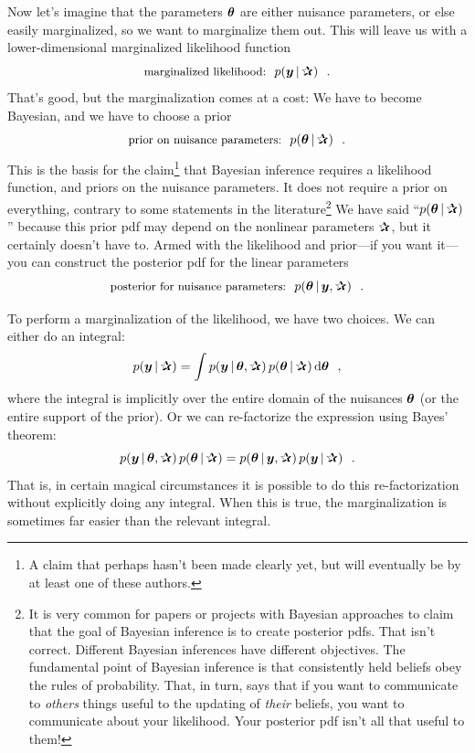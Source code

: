 Now let's imagine that the parameters $\boldsymbol{\theta}$ are either nuisance
parameters, or else easily marginalized, so we want to marginalize
them out.
This will leave us with a lower-dimensional marginalized likelihood
function
\begin{equation}
\mbox{\small marginalized likelihood:} \hquad p(\vy\given\bP) \hquad.
\end{equation}
That's good, but the marginalization comes at a cost:
We have to become Bayesian, and we have to choose a prior
\begin{equation}
\mbox{\small prior on nuisance parameters:} \hquad p(\vtheta\given\bP) \hquad.
\end{equation}
This is the basis for the claim\footnote{A claim that perhaps hasn't been made clearly
  yet, but will eventually be by at least one of these authors.} that Bayesian
inference requires a likelihood function, and priors on the nuisance parameters.
It does not require a prior on everything, contrary to some statements
in the literature\footnote{It is very common for papers or projects with
  Bayesian approaches to claim that the
  goal of Bayesian inference is to create posterior pdfs. That isn't correct.
  Different Bayesian inferences have different objectives. The fundamental
  point
  of Bayesian inference is that consistently held beliefs obey the rules of
  probability. That, in turn, says that if you want
  to communicate to \emph{others} things useful to the
  updating of \emph{their} beliefs, you want to communicate about your likelihood.
  Your posterior pdf isn't all that useful to them!\label{note:lf}}
We have said ``$p(\vtheta\given\bP)$'' because this prior pdf may depend on
the nonlinear parameters $\bP$, but it certainly doesn't have to.
Armed with the likelihood and prior---if you want it---you can construct
the posterior pdf for the linear parameters
\begin{equation}
\mbox{\small posterior for nuisance parameters:} \hquad p(\vtheta\given\vy,\bP) \hquad.
\end{equation}

To perform a marginalization of the likelihood, we have two choices.
We can either do an integral:
\begin{equation}\label{eq:integral}
p(\vy\given\bP) = \int p(\vy\given\vtheta,\bP)\,p(\vtheta\given\bP)\,\dd\vtheta
\hquad,
\end{equation}
where the integral is implicitly over the entire domain of the
nuisances $\boldsymbol{\theta}$ (or the entire support of the prior).
Or we can re-factorize the expression using Bayes' theorem:
\begin{equation}
p(\vy\given\vtheta,\bP)\,p(\vtheta\given\bP)
 = p(\vtheta\given\vy,\bP)\,p(\vy\given\bP)
\hquad.
\end{equation}
That is, in certain magical circumstances it is possible to do this
re-factorization without explicitly doing any integral.
When this is true, the marginalization is sometimes far easier than
the relevant integral.

